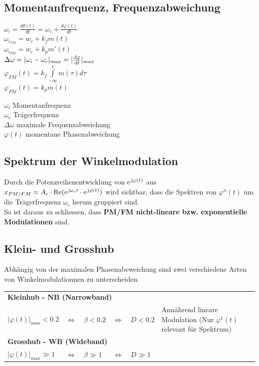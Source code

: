 \subsection{Momentanfrequenz, Frequenzabweichung}
\begin{multicols}{2}
	\begin{center}
		$ \omega_i = \frac{d \theta(t)}{dt} = \omega_c + \frac{d \varphi(t)}{dt} $\\
		$\omega_{i_{FM}} = w_c + k_f m(t)$\\
		$\omega_{i_{PM}} = w_c + k_p m'(t)$\\
		$\Delta \omega = |\omega_i - \omega_c|_{max} = |\frac{\mathop{}\!\mathrm{d} \varphi}{\mathop{}\!\mathrm{d} t}|_{max}$ \\
		$\varphi_{FM}(t) = k_f \int\limits_{- \infty}^{t} m(\tau)
		d\tau$\\
		$\varphi_{PM}(t) = k_pm(t)$
	\end{center}
	
	\columnbreak
	$\omega_i$ Momentanfrequenz \\
	$\omega_c$ Trägerfrequenz \\
	$\Delta \omega$ maximale Frequenzabweichung \\
	$\varphi(t)$ momentane Phasenabweichung \\
\end{multicols}

\subsection{Spektrum der Winkelmodulation}
Durch die Potenzreihenentwicklung von $\e^{\im\varphi(t)}$ aus $x_{PM/FM} = A_c \cdot \Real(\e^{\im \omega_c t} \cdot \e^{\im\varphi(t)})$ wird sichtbar, dass die Spektren von $\varphi^n(t)$ um die Trägerfrequenz $\omega_c$ herum gruppiert sind.\\
So ist daraus zu schliessen, dass \textbf{PM/FM nicht-lineare bzw. exponentielle Modulationen} sind.

\subsection{Klein- und Grosshub }
Abhängig von der maximalen Phasenabeweichung sind zwei verschiedene Arten von Winkelmodulationnen zu
unterscheiden.

\begin{tabular}{llll}
\multicolumn{3}{l}{\textbf{Kleinhub - NB (Narrowband)}} \\
	$|\varphi(t)|_{max} < 0.2$ 
	& $\Leftrightarrow \quad \beta < 0.2$
	& $\Leftrightarrow \quad D < 0.2$ 
	& Ann\"ahrend lineare Modulation (Nur $\varphi^1(t)$ relevant für Spektrum)\\

\multicolumn{3}{l}{\textbf{Grosshub - WB (Wideband)}}\\
 $|\varphi(t)|_{max} \gg 1$
 & $\Leftrightarrow \quad \beta \gg 1$
 & $\Leftrightarrow \quad D \gg 1$

\end{tabular}
 

